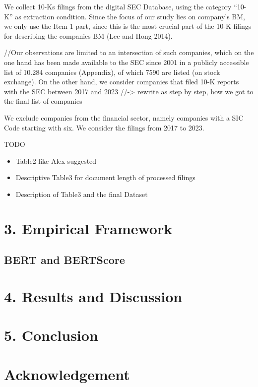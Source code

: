 \documentclass[
]{article}
\providecommand{\tightlist}{%
  \setlength{\itemsep}{0pt}\setlength{\parskip}{0pt}}\usepackage{longtable,booktabs,array}
\begin{document}
We collect 10-Ks filings from the digital SEC Database, using the
category ``10-K'' as extraction condition. Since the focus of our study
lies on company's BM, we only use the Item 1 part, since this is the
most crucial part of the 10-K filings for describing the companies BM
(Lee and Hong 2014).

//Our observations are limited to an intersection of such companies,
which on the one hand has been made available to the SEC since 2001 in a
publicly accessible list of 10.284 companies (Appendix), of which 7590
are listed (on stock exchange). On the other hand, we consider companies
that filed 10-K reports with the SEC between 2017 and 2023
//-\textgreater{} rewrite as step by step, how we got to the final list
of companies

We exclude companies from the financial sector, namely companies with a
SIC Code starting with six. We consider the filings from 2017 to 2023.

TODO

\begin{itemize}
\tightlist
\item
  Table2 like Alex suggested
\item
  Descriptive Table3 for document length of processed filings
\item
  Description of Table3 and the final Dataset
\end{itemize}

\section{3. Empirical Framework}\label{empirical-framework}

\subsection{BERT and BERTScore}\label{bert-and-bertscore}

\section{4. Results and Discussion}\label{results-and-discussion}

\section{5. Conclusion}\label{conclusion}

\section{Acknowledgement}\label{acknowledgement}
\end{document}
